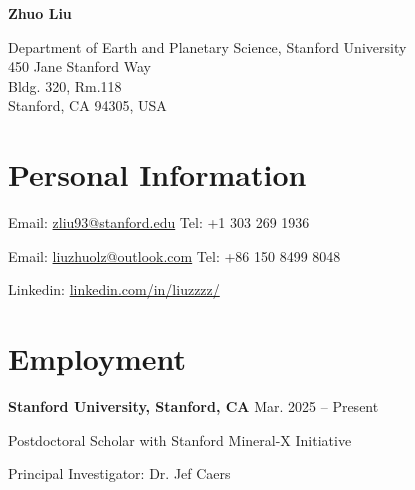 \documentclass[paper=a4,fontsize=11pt]{scrartcl} %
\newcommand{\sepspace}{\vspace*{0.5em}}		%
\newcommand{\NameAffiliation}[5]{
  \noindent
  \begin{minipage}[t]{0.45\textwidth}
    \vspace{0pt} %
    {\fontsize{32}{32} \usefont{OT1}{phv}{m}{n} \textbf{#1}}
  \end{minipage}%
  \hfill
  \begin{minipage}[t]{0.5\textwidth}
    \vspace{0pt} %
    \raggedleft
    {\large \usefont{OT1}{phv}{m}{n} #2 \\}
    {\large \usefont{OT1}{phv}{m}{n} #3 \\}
    {\large \usefont{OT1}{phv}{m}{n} #4 \\}
    {\large \usefont{OT1}{phv}{m}{n} #5}
  \end{minipage}
}
\newcommand{\NewPart}[1]{\section*{{#1}}}
\begin{document}




\NameAffiliation
{Zhuo Liu}
{Department of Earth and Planetary Science, Stanford University}
{450 Jane Stanford Way}
{Bldg. 320, Rm.118}
{Stanford, CA 94305, USA}

\sepspace

\NewPart{Personal Information}{}
\hspace{2em} Email: \url{zliu93@stanford.edu} \hspace{10em} Tel: +1 303 269 1936 

\hspace{1em} Email: \url{liuzhuolz@outlook.com} \hspace{8.95em} Tel: +86 150 8499 8048

\hspace{1em} Linkedin: \url{linkedin.com/in/liuzzzz/} 
\sepspace




\NewPart{Employment}{}
\hspace{2em} \textbf{Stanford University, Stanford, CA} \hspace{20em} Mar. 2025 – Present

\hspace{1em} Postdoctoral Scholar with Stanford Mineral-X Initiative

\hspace{1em} Principal Investigator: Dr. Jef Caers
\sepspace
\end{document}

